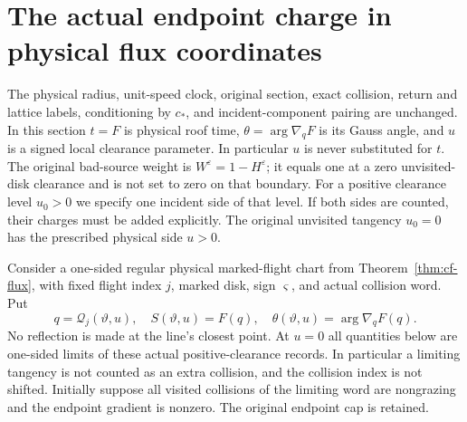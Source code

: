 
\section{The actual endpoint charge in physical flux coordinates}
\label{sec:bf-actual-flux}

The physical radius, unit-speed clock, original section, exact collision,
return and lattice labels, conditioning by $c_*$, and incident-component
pairing are unchanged.  In this section $t=F$ is physical roof time,
$\theta=\arg\nabla_qF$ is its Gauss angle, and $u$ is a signed local
clearance parameter.  In particular $u$ is never substituted for $t$.
The original bad-source weight is $W^\varepsilon=1-H^\varepsilon$;
it equals one at a zero unvisited-disk clearance and is not set to zero
on that boundary.
For a positive clearance level $u_0>0$ we specify one incident side
of that level.  If both sides are counted, their charges must be
added explicitly.  The original unvisited tangency $u_0=0$ has the
prescribed physical side $u>0$.

Consider a one-sided regular physical marked-flight chart from
Theorem~\ref{thm:cf-flux}, with fixed flight index $j$, marked disk,
sign $\varsigma$, and actual collision word.  Put
\[
 q=\mathcal Q_j(\vartheta,u),\quad
 S(\vartheta,u)=F(q),\quad
 \theta(\vartheta,u)=\arg\nabla_qF(q).
\]
No reflection is made at the line's closest point.  At $u=0$ all
quantities below are one-sided limits of these actual positive-clearance
records.  In particular a limiting tangency is not counted as an extra
collision, and the collision index is not shifted.  Initially suppose
all visited collisions of the limiting word are nongrazing and the
endpoint gradient is nonzero.  The original endpoint cap is retained.

